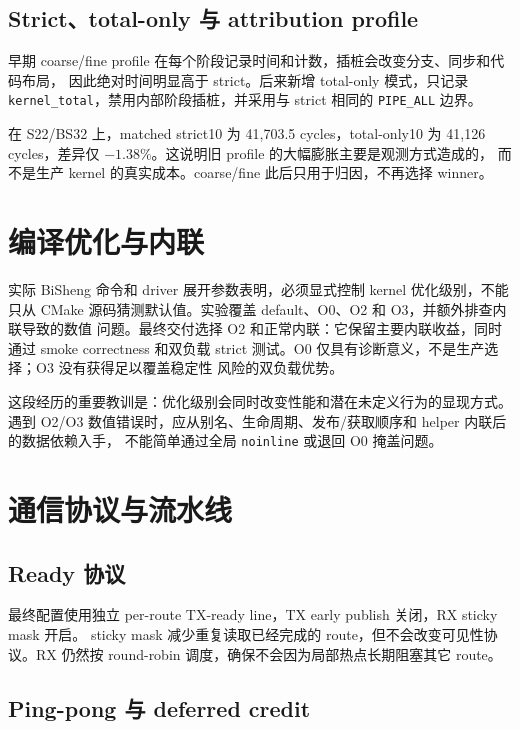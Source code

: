 \documentclass[UTF8,a4paper,11pt]{ctexart}
\begin{document}
\subsection{Strict、total-only 与 attribution profile}

早期 coarse/fine profile 在每个阶段记录时间和计数，插桩会改变分支、同步和代码布局，
因此绝对时间明显高于 strict。后来新增 total-only 模式，只记录
\texttt{kernel\_total}，禁用内部阶段插桩，并采用与 strict 相同的
\texttt{PIPE\_ALL} 边界。

在 S22/BS32 上，matched strict10 为 41,703.5 cycles，total-only10 为
41,126 cycles，差异仅 $-1.38\%$。这说明旧 profile 的大幅膨胀主要是观测方式造成的，
而不是生产 kernel 的真实成本。coarse/fine 此后只用于归因，不再选择 winner。

\section{编译优化与内联}

实际 BiSheng 命令和 driver 展开参数表明，必须显式控制 kernel 优化级别，不能只从
CMake 源码猜测默认值。实验覆盖 default、O0、O2 和 O3，并额外排查内联导致的数值
问题。最终交付选择 O2 和正常内联：它保留主要内联收益，同时通过 smoke correctness
和双负载 strict 测试。O0 仅具有诊断意义，不是生产选择；O3 没有获得足以覆盖稳定性
风险的双负载优势。

这段经历的重要教训是：优化级别会同时改变性能和潜在未定义行为的显现方式。遇到
O2/O3 数值错误时，应从别名、生命周期、发布/获取顺序和 helper 内联后的数据依赖入手，
不能简单通过全局 \texttt{noinline} 或退回 O0 掩盖问题。

\section{通信协议与流水线}

\subsection{Ready 协议}

最终配置使用独立 per-route TX-ready line，TX early publish 关闭，RX sticky mask 开启。
sticky mask 减少重复读取已经完成的 route，但不会改变可见性协议。RX 仍然按
round-robin 调度，确保不会因为局部热点长期阻塞其它 route。

\subsection{Ping-pong 与 deferred credit}
\end{document}
